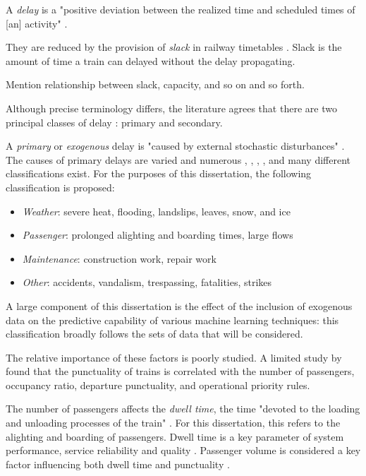 \documentclass{article}
\begin{document}
A \textit{delay} is a "positive deviation between the realized time and scheduled times of [an] activity" \cite{cerreto_nielsen_harrod_nielsen_2016}. 

They are reduced by the provision of  \textit{slack} in railway timetables \cite{cerreto_nielsen_harrod_nielsen_2016}. Slack is the amount of time a train can delayed without the delay propagating. 

Mention relationship between slack, capacity, and so on and so forth.

Although precise terminology differs, the literature agrees that there are two principal classes of delay \cite{olsson_haugland_2004}: primary and secondary.

A \textit{primary} or \textit{exogenous} delay is "caused by external stochastic disturbances" \cite{oneto_fumeo_clerico_canepa_papa_dambra_mazzino_anguita_2016}. The causes of primary delays are varied and numerous \cite{berger_et_al_2011}, \cite{milinkovic_markovic_veskovic_ivic_pavlovic_2013}, \cite{nr_delay_causes}, \cite{cerreto_nielsen_harrod_nielsen_2016}, and many different classifications exist. For the purposes of this dissertation, the following classification is proposed:

\begin{itemize}
	\item \textit{Weather}: severe heat, flooding, landslips, leaves, snow, and ice
	\item \textit{Passenger}: prolonged alighting and boarding times, large flows
	\item \textit{Maintenance}: construction work, repair work
	\item \textit{Other}: accidents, vandalism, trespassing, fatalities, strikes
\end{itemize}

A large component of this dissertation is the effect of the inclusion of exogenous data on the predictive capability of various machine learning techniques: this classification broadly follows the sets of data that will
be considered. 

The relative importance of these factors is poorly studied. A limited study by \cite{olsson_haugland_2004} found that the punctuality of trains is correlated with the number of passengers, occupancy ratio, departure punctuality, and operational priority rules.

The number of passengers affects the \textit{dwell time}, the time "devoted to the loading and unloading processes of the train" \cite{san_mohd_masirin_2016}. For this dissertation, this refers to the alighting
and boarding of passengers. Dwell time is a key parameter of system performance, service reliability and quality \cite{puong_2000}. Passenger volume is considered a key factor influencing both dwell time \cite{san_mohd_masirin_2016} and punctuality \cite{olsson_haugland_2004}.
\end{document}
